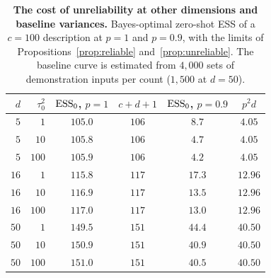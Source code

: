 \begin{table}[t]
\centering\small
\caption[The cost of unreliability at other dimensions and baseline variances]{\textbf{The cost of unreliability at other dimensions and baseline variances.} Bayes-optimal zero-shot ESS of a $c=100$ description at $p=1$ and $p=0.9$, with the limits of Propositions~\ref{prop:reliable} and~\ref{prop:unreliable}. The baseline curve is estimated from $4{,}000$ sets of demonstration inputs per count ($1{,}500$ at $d=50$).}
\label{tab:grid}
\vspace{3pt}
\begin{tabular}{rrcccc}
\toprule
$d$ & $\tau_0^2$ & $\mathrm{ESS}_0$, $p=1$ & $c+d+1$ & $\mathrm{ESS}_0$, $p=0.9$ & $p^2d$ \\
\midrule
$5$ & $1$ & $105.0$ & $106$ & $8.7$ & $4.05$ \\
$5$ & $10$ & $105.8$ & $106$ & $4.7$ & $4.05$ \\
$5$ & $100$ & $105.9$ & $106$ & $4.2$ & $4.05$ \\
$16$ & $1$ & $115.8$ & $117$ & $17.3$ & $12.96$ \\
$16$ & $10$ & $116.9$ & $117$ & $13.5$ & $12.96$ \\
$16$ & $100$ & $117.0$ & $117$ & $13.0$ & $12.96$ \\
$50$ & $1$ & $149.5$ & $151$ & $44.4$ & $40.50$ \\
$50$ & $10$ & $150.9$ & $151$ & $40.9$ & $40.50$ \\
$50$ & $100$ & $151.0$ & $151$ & $40.5$ & $40.50$ \\
\bottomrule
\end{tabular}
\end{table}
